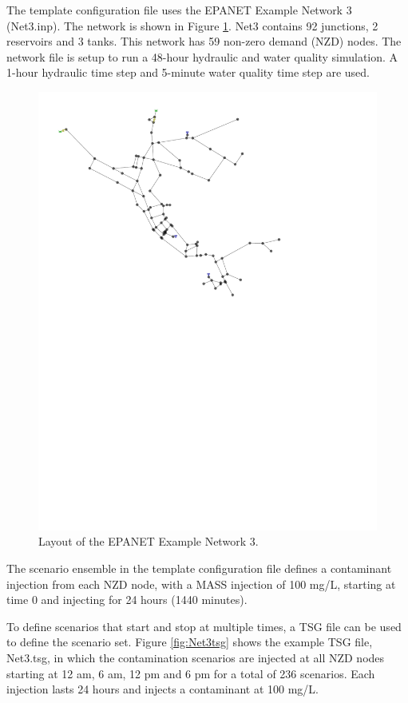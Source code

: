 The  template configuration file uses the EPANET Example Network 3 (Net3.inp).  
The network is shown in Figure \ref{fig:Net3}. 
Net3 contains 92 junctions, 2 reservoirs and 3 tanks. This network has 59 non-zero 
demand (NZD) nodes. The network file is setup to run a 
48-hour hydraulic and water quality simulation. A 1-hour 
hydraulic time step and 5-minute water quality time step are used.

\begin{figure}[h]
  \centering
  \includegraphics[scale=0.80]{graphics/Net3.pdf}
  \caption{Layout of the EPANET Example Network 3.}
  \label{fig:Net3}
\end{figure}

The scenario ensemble in the  template configuration file defines 
a contaminant injection from each NZD node, with a MASS injection of 100 mg/L, starting 
at time 0 and injecting for 24 hours (1440 minutes).  

To define scenarios that start and stop at multiple times, a TSG file can be 
used to define the scenario set. Figure \ref{fig:Net3tsg} shows the example TSG file, Net3.tsg, in which the 
contamination scenarios are injected at all NZD nodes 
starting at 12 am, 6 am, 12 pm and 6 pm for a total of 236 scenarios. Each injection 
lasts 24 hours and injects a contaminant at 100 mg/L.

